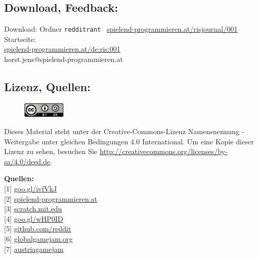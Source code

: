 \subsection*{Download, Feedback:}
\footnotesize{
Download: Ordner \texttt{redditrant} \Mundus\ \href{http://spielend-programmieren.at/risjournal/001}{spielend-programmieren.at/risjournal/001}\\
Startseite:\\
\href{http://spielend-programmieren.at/de:ris:001}{spielend-programmieren.at/de:ris:001}\\ 
\Letter\: horst.jens@spielend-programmieren.at\\}
\normalsize 


\subsection*{Lizenz, Quellen:}
\begin{figure}
\includegraphics[width=2cm]{redditrant/ccbysa88x31.png} 
\end{figure}
Dieses Material steht unter der Creative-Commons-Lizenz Namensnennung - Weitergabe unter gleichen Bedingungen 4.0 International. Um eine Kopie dieser Lizenz zu sehen, besuchen Sie \url{http://creativecommons.org/licenses/by-sa/4.0/deed.de}.

\textbf{Quellen:} \\
{[}1{]} \href{http://www.reddit.com/r/gamedev/comments/z83h2/the_games_industry_is_a_scam_and_this_is_why_you}{goo.gl/ivfVkJ} \\
{[}2{]} \href{http://spielend-programmieren.at}{spielend-programmieren.at} \\
{[}3{]} \href{http://scratch.mit.edu/}{scratch.mit.edu} \\
{[}4{]} \href{http://spielend-programmieren.at/de:mailinglist}{goo.gl/wHP0ID} \\
{[}5{]} \href{http://github.com/reddit/}{github.com/reddit} \\
{[}6{]} \href{http://globalgamejam.org/}{globalgamejam.org} \\
{[}7{]} \href{http://austriagamejam.org/}{austriagamejam} 

